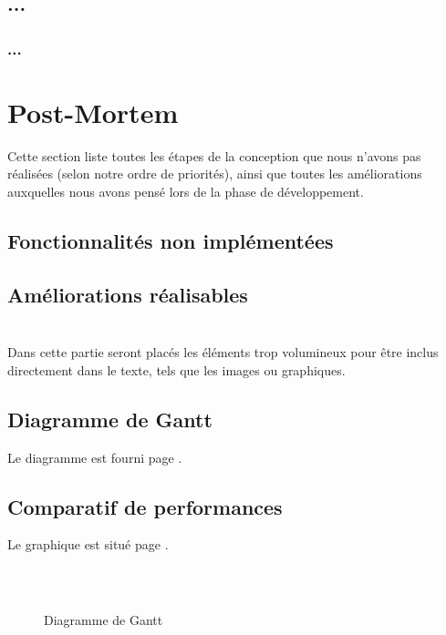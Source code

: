 \documentclass[a4paper]{memoir}
\begin{document}
		\section{...}
			
		
			\subsection{...}
				
			
	\chapter{Post-Mortem}
		Cette section liste toutes les étapes de la conception que nous n'avons pas réalisées (selon notre ordre de priorités), ainsi que toutes les améliorations auxquelles nous avons pensé lors de la phase de développement.
		
		\section{Fonctionnalités non implémentées}
			
			
		\section{Améliorations réalisables}
			
	
	\appendix
	\chapter{}
		Dans cette partie seront placés les éléments trop volumineux pour être inclus directement dans le texte, tels que les images ou graphiques.\\
		
		\section{Diagramme de Gantt}
			Le diagramme est fourni page \pageref{fig:gantt}.
			
		\section{Comparatif de performances}
			Le graphique est situé page \pageref{fig:analyse}.
			
		\section*{}
			\begin{figure}
				\vspace{-3,5cm} \hspace{-4,5cm} \includegraphics[scale=0.6]{img/Gantt.png}
				\label{fig:gantt}
				\vspace{-0,5cm} \caption{Diagramme de Gantt}
			\end{figure}
			
\end{document}
